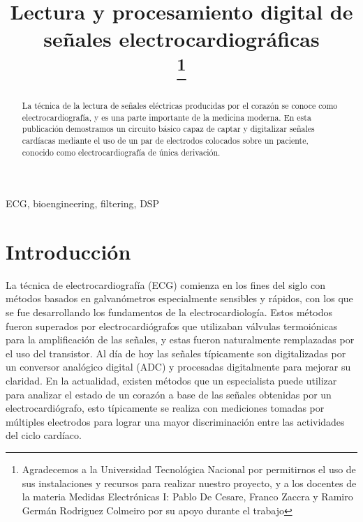 \documentclass[conference]{IEEEtran}
\begin{document}
 
\title{Lectura y procesamiento digital de señales electrocardiográficas\\
\thanks{Agradecemos a la Universidad Tecnológica Nacional por permitirnos
el uso de sus instalaciones y recursos para realizar nuestro proyecto, y a los
docentes de la materia Medidas Electrónicas I: Pablo De Cesare, Franco Zaccra
y Ramiro Germán Rodriguez Colmeiro por su apoyo durante el trabajo}
}

\author{
\and
{}
\and
{}
}

\maketitle

\begin{abstract}
La técnica de la lectura de señales eléctricas producidas por el corazón se conoce
como electrocardiografía, y es una parte importante de la medicina moderna. En esta
publicación demostramos un circuito básico capaz de captar y digitalizar señales
cardíacas mediante el uso de un par de electrodos colocados sobre un paciente,
conocido como electrocardiografía de única derivación. 
\end{abstract}

\begin{IEEEkeywords}
ECG, bioengineering, filtering, DSP
\end{IEEEkeywords}

\section{Introducción}
 
La técnica de electrocardiografía (ECG) comienza en los fines del siglo  con
métodos basados en galvanómetros especialmente sensibles y rápidos, con los que se
fue desarrollando los fundamentos de la electrocardiología. Estos métodos fueron
superados por electrocardiógrafos que utilizaban válvulas termoiónicas para la
amplificación de las señales, y estas fueron naturalmente remplazadas por el uso
del transistor. Al día de hoy las señales típicamente son digitalizadas por un
conversor analógico digital (ADC) y procesadas digitalmente para mejorar su claridad. 
En la actualidad, existen métodos que un especialista puede utilizar para analizar
el estado de un corazón a base de las señales obtenidas por un electrocardiógrafo,
esto típicamente se realiza con mediciones tomadas por múltiples electrodos para
lograr una mayor discriminación entre las actividades del ciclo cardíaco.
\cite{ecg_history}
\end{document}
